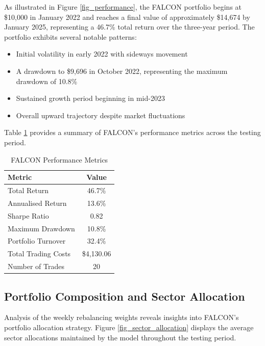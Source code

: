 \documentclass[conference]{IEEEtran}
\begin{document}
As illustrated in Figure \ref{fig_performance}, the FALCON portfolio begins at \$10,000 in January 2022 and reaches a final value of approximately \$14,674 by January 2025, representing a 46.7\% total return over the three-year period. The portfolio exhibits several notable patterns:

\begin{itemize}
\item Initial volatility in early 2022 with sideways movement
\item A drawdown to \$9,696 in October 2022, representing the maximum drawdown of 10.8\%
\item Sustained growth period beginning in mid-2023
\item Overall upward trajectory despite market fluctuations
\end{itemize}

Table \ref{tab:performance_metrics} provides a summary of FALCON's performance metrics across the testing period.

\begin{table}[htbp]
\caption{FALCON Performance Metrics}
\begin{center}
\begin{tabular}{lc}
\hline
\textbf{Metric} & \textbf{Value} \\
\hline
Total Return & 46.7\% \\
Annualised Return & 13.6\% \\
Sharpe Ratio & 0.82 \\
Maximum Drawdown & 10.8\% \\
Portfolio Turnover & 32.4\% \\
Total Trading Costs & \$4,130.06 \\
Number of Trades & 20 \\
\hline
\end{tabular}
\label{tab:performance_metrics}
\end{center}
\end{table}

\subsection{Portfolio Composition and Sector Allocation}
Analysis of the weekly rebalancing weights reveals insights into FALCON's portfolio allocation strategy. Figure \ref{fig_sector_allocation} displays the average sector allocations maintained by the model throughout the testing period.
\end{document}
